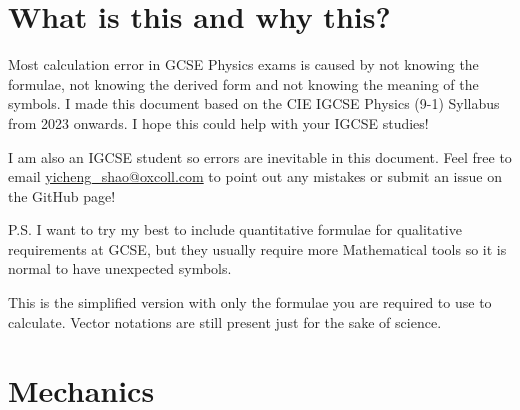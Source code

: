 \documentclass[8pt]{article}
\author{\Author}
\title{\Title}
\date{Version for In-School Distribution 1.0.1. \Date}
\begin{document}
	\maketitle

	\tableofcontents

    \section*{What is this and why this?}
        Most calculation error in GCSE Physics exams is caused by not knowing the formulae, not knowing the derived form and not knowing the meaning of the symbols. I made this document based on the CIE IGCSE Physics (9-1) Syllabus from 2023 onwards. I hope this could help with your IGCSE studies!

        I am also an IGCSE student so errors are inevitable in this document. Feel free to email \href{yicheng\_shao@oxcoll.com}{yicheng\_shao@oxcoll.com} to point out any mistakes or submit an issue on the GitHub page!

        P.S. I want to try my best to include quantitative formulae for qualitative requirements at GCSE, but they usually require more Mathematical tools so it is normal to have unexpected symbols.

        This is the simplified version with only the formulae you are required to use to calculate. Vector notations are still present just for the sake of science.

    \section{Mechanics}
\end{document}
